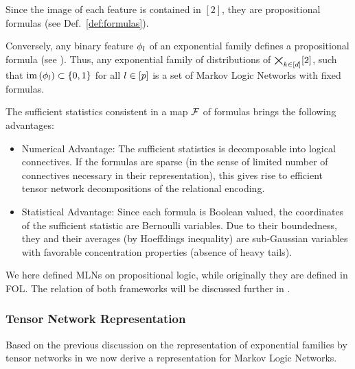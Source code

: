 Since the image of each feature is contained in $[2]$, they are propositional formulas (see Def.~\ref{def:formulas}).

Conversely, any binary feature $\phi_{l}$ of an exponential family defines a propositional formula (see ).
Thus, any exponential family of distributions of $\bigtimes_{k\in[d]}[2]$, such that $\mathrm{im}\left(\phi_{l}\right)\subset\{0,1\}$ for all $l\in[p]$ is a set of Markov Logic Networks with fixed formulas.



The sufficient statistics consistent in a map $\mathcal{F}$ of formulas brings the following advantages:
\begin{itemize}
	\item Numerical Advantage: The sufficient statistics is decomposable into logical connectives. 
	If the formulas are sparse (in the sense of limited number of connectives necessary in their representation), this gives rise to efficient tensor network decompositions of the relational encoding.
	\item Statistical Advantage: Since each formula is Boolean valued, the coordinates of the sufficient statistic are Bernoulli variables. 
	Due to their boundedness, they and their averages (by Hoeffdings inequality) are sub-Gaussian variables with favorable concentration properties (absence of heavy tails).
\end{itemize}


\begin{remark}
	We here defined MLNs on propositional logic, while originally they are defined in FOL.
	The relation of both frameworks will be discussed further in .
\end{remark}



\subsubsection{Tensor Network Representation}

Based on the previous discussion on the representation of exponential families by tensor networks in  we now derive a representation for Markov Logic Networks.


